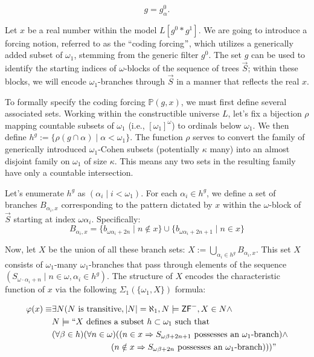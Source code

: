 \documentclass[a4paper,11pt]{article}
\newcommand{\forceP}{\mathbb{P}}
\newcommand{\ZFP}{\mathsf{ZF}^-}
\begin{document}
\[g= g^0_{\alpha}. \]





Let $x$ be a real number within the model $L[g^0 \ast g^1]$. We are going to introduce a forcing notion, referred to as the ``coding forcing$"$, which utilizes a generically added subset of $\omega_1$, stemming from the generic filter $g^0$. The set $g$ can be used to identify the starting indices of $\omega$-blocks of the sequence of trees $\vec{S}$; within these blocks, we will encode $\omega_1$-branches through $\vec{S}$ in a manner that reflects the real $x$.

To formally specify the coding forcing $\forceP(g,x)$, we must first define several associated sets. Working within the constructible universe $L$, let's fix a bijection $\rho$ mapping countable subsets of $\omega_1$ (i.e., $[\omega_1]^{\omega}$) to ordinals below $\omega_1$. We then define $h^g := \{ \rho (g \cap \alpha) \mid \alpha < \omega_1 \}$. The function $\rho$ serves to convert the family of generically introduced $\omega_1$-Cohen subsets (potentially $\kappa$ many) into an almost disjoint family on $\omega_1$ of size $\kappa$. This means any two sets in the resulting family have only a countable intersection.

Let's enumerate $h^g$ as $(\alpha_i \mid i < \omega_1)$. For each $\alpha_i \in h^g$, we define a set of branches $B_{\alpha_i,x}$ corresponding to the pattern dictated by $x$ within the $\omega$-block of $\vec{S}$ starting at index $\omega \alpha_i$. Specifically:
\[ B_{\alpha_i,x} = \{ b_{\omega \alpha_i + 2n} \mid n \notin x \} \cup \{ b_{ \omega \alpha_i + 2n+ 1} \mid n \in x \} \]

Now, let $X$ be the union of all these branch sets: $X := \bigcup_{\alpha_i \in h^g} B_{\alpha_i,x}$. This set $X$ consists of $\omega_1$-many $\omega_1$-branches that pass through elements of the sequence $(S_{\omega \cdot \alpha_i + n} \mid n \in \omega, \alpha_i \in h^g)$. The structure of $X$ encodes the characteristic function of $x$ via the following $\Sigma_1(\{\omega_1,X\})$ formula:

\begin{align*}
\varphi(x) \equiv & \exists N (N \text{ is transitive}, |N| = \aleph_1, N \models \ZFP, X \in N \land \\ & N \models `` X \text{ defines a subset } h \subset \omega_1 \text{ such that } \\ & (\forall \beta \in h)(\forall n \in \omega) ( (n \in x \Rightarrow S_{\omega \beta + 2n + 1} \text{ possesses an } \omega_1\text{-branch}) \land \\ & \qquad \qquad \qquad \quad (n \notin x \Rightarrow S_{\omega \beta + 2n} \text{ possesses an } \omega_1\text{-branch}) ) )"
\end{align*}
\end{document}
